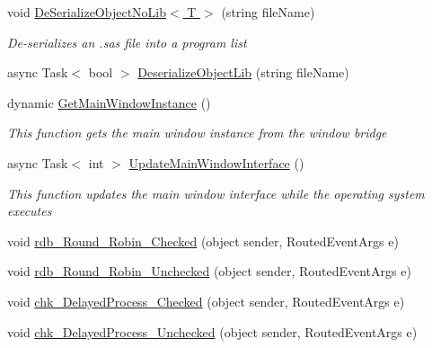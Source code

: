 \begin{DoxyCompactItemize}
\item 
void \hyperlink{class_c_p_u___o_s___simulator_1_1_operating_system_main_window_a76308e7789966a2b612b0ff59cc9ac98}{De\+Serialize\+Object\+No\+Lib$<$ T $>$} (string file\+Name)
\begin{DoxyCompactList}\small\item\em De-\/serializes an .sas file into a program list \end{DoxyCompactList}\item 
async Task$<$ bool $>$ \hyperlink{class_c_p_u___o_s___simulator_1_1_operating_system_main_window_a101a9eba4d603045fd4539eb28e0f4b1}{Deserialize\+Object\+Lib} (string file\+Name)
\item 
dynamic \hyperlink{class_c_p_u___o_s___simulator_1_1_operating_system_main_window_a8d21cdb52091b9568f14f7e66b7422ca}{Get\+Main\+Window\+Instance} ()
\begin{DoxyCompactList}\small\item\em This function gets the main window instance from the window bridge \end{DoxyCompactList}\item 
async Task$<$ int $>$ \hyperlink{class_c_p_u___o_s___simulator_1_1_operating_system_main_window_a6ce2ed7107086d825854da88e20508ed}{Update\+Main\+Window\+Interface} ()
\begin{DoxyCompactList}\small\item\em This function updates the main window interface while the operating system executes \end{DoxyCompactList}\item 
void \hyperlink{class_c_p_u___o_s___simulator_1_1_operating_system_main_window_a3bc41466bb59866b4157310c9f6aa7a6}{rdb\+\_\+\+Round\+\_\+\+Robin\+\_\+\+Checked} (object sender, Routed\+Event\+Args e)
\item 
void \hyperlink{class_c_p_u___o_s___simulator_1_1_operating_system_main_window_aa51e30b2f3d96ef188b2237049c1fae0}{rdb\+\_\+\+Round\+\_\+\+Robin\+\_\+\+Unchecked} (object sender, Routed\+Event\+Args e)
\item 
void \hyperlink{class_c_p_u___o_s___simulator_1_1_operating_system_main_window_af5f4146e6a7a937a9951ab388710690f}{chk\+\_\+\+Delayed\+Process\+\_\+\+Checked} (object sender, Routed\+Event\+Args e)
\item 
void \hyperlink{class_c_p_u___o_s___simulator_1_1_operating_system_main_window_af44e2e2524c4d76e7af6d3e058fe594d}{chk\+\_\+\+Delayed\+Process\+\_\+\+Unchecked} (object sender, Routed\+Event\+Args e)
\item 

\end{DoxyCompactItemize}
